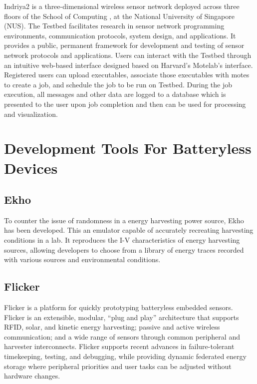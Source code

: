 Indriya2 \cite{indriya2} is a three-dimensional wireless sensor network deployed across three floors of the School of Computing , at the National University of Singapore (NUS). The Testbed facilitates research in sensor network programming environments, communication protocols, system design, and applications. It provides a public, permanent framework for development and testing of sensor network protocols and applications. Users can interact with the Testbed through an intuitive web-based interface designed based on Harvard's Motelab's interface. Registered users can upload executables, associate those executables with motes to create a job, and schedule the job to be run on Testbed. During the job execution, all messages and other data are logged to a database which is presented to the user upon job completion and then can be used for processing and visualization. 

\section{Development Tools For Batteryless Devices}

\subsection{Ekho}

To counter the issue of randomness in a energy harvesting power source, Ekho \cite{ekho} has been developed. This an emulator capable of accurately recreating harvesting conditions in a lab. It reproduces the I-V characteristics of energy harvesting sources, allowing developers to choose from a library of energy traces recorded with various sources and environmental conditions.

\subsection{Flicker}
Flicker \cite{flicker} is a platform for quickly prototyping batteryless embedded sensors. Flicker is an extensible, modular, “plug and play” architecture that supports RFID, solar, and kinetic energy harvesting; passive and active wireless communication; and a wide range of sensors through common peripheral and harvester interconnects. Flicker supports recent advances in failure-tolerant timekeeping, testing, and debugging, while providing dynamic federated energy storage where peripheral priorities and user tasks can be adjusted without hardware changes.

